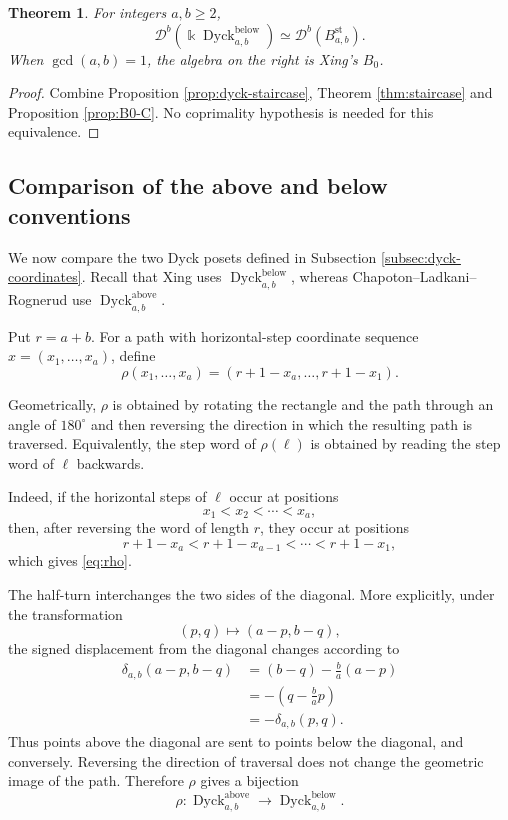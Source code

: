 \documentclass[12pt,a4paper,english,reqno]{amsart}
\theoremstyle{plain}
\newtheorem{theorem}{Theorem}[section]
\theoremstyle{definition}
\newcommand{\kk}{\Bbbk}
\newcommand{\Dyck}{\operatorname{Dyck}}
\newcommand{\Db}[1]{{\mathscr D}^b(#1)}
\begin{document}
\begin{theorem}
\label{thm:below-B0}
For integers $a,b\geq2$,
\begin{equation}
 \Db{\kk\Dyck^{\mathrm{below}}_{a,b}}\simeq\Db{B^{\mathrm{st}}_{a,b}}.
\label{eq:below-B0}
\end{equation}
When $\gcd(a,b)=1$, the algebra on the right is Xing's $B_0$.
\end{theorem}

\begin{proof}
Combine Proposition \ref{prop:dyck-staircase}, Theorem \ref{thm:staircase} and Proposition \ref{prop:B0-C}.
No coprimality hypothesis is needed for this equivalence.
\end{proof}

\subsection{Comparison of the above and below conventions}

We now compare the two Dyck posets defined in Subsection
\ref{subsec:dyck-coordinates}. Recall that Xing uses
$\Dyck^{\mathrm{below}}_{a,b}$, whereas
Chapoton--Ladkani--Rognerud use
$\Dyck^{\mathrm{above}}_{a,b}$.

Put $r=a+b$.
For a path with horizontal-step coordinate sequence $x=(x_1,\ldots,x_a)$,
define
\begin{equation}
\rho(x_1,\ldots,x_a)
=
(r+1-x_a,\ldots,r+1-x_1).
\label{eq:rho}
\end{equation}

Geometrically, $\rho$ is obtained by rotating the rectangle and the
path through an angle of $180^\circ$ and then reversing the direction
in which the resulting path is traversed. Equivalently, the step word
of $\rho(\ell)$ is obtained by reading the step word of $\ell$
backwards.

Indeed, if the horizontal steps of $\ell$ occur at positions
\[
x_1<x_2<\cdots<x_a,
\]
then, after reversing the word of length $r$, they occur at positions
\[
r+1-x_a<r+1-x_{a-1}<\cdots<r+1-x_1,
\]
which gives \eqref{eq:rho}.

The half-turn interchanges the two sides of the diagonal. More
explicitly, under the transformation
\[
(p,q)\longmapsto(a-p,b-q),
\]
the signed displacement from the diagonal changes according to
\[
\begin{split}
\delta_{a,b}(a-p,b-q)
&=
(b-q)-\frac ba(a-p)\\
&=
-\left(q-\frac ba p\right)\\
&=
-\delta_{a,b}(p,q).
\end{split}
\]
Thus points above the diagonal are sent to points below the diagonal,
and conversely. Reversing the direction of traversal does not change
the geometric image of the path. Therefore $\rho$ gives a bijection
\[
\rho:
\Dyck^{\mathrm{above}}_{a,b}
\longrightarrow
\Dyck^{\mathrm{below}}_{a,b}.
\]
\end{document}

